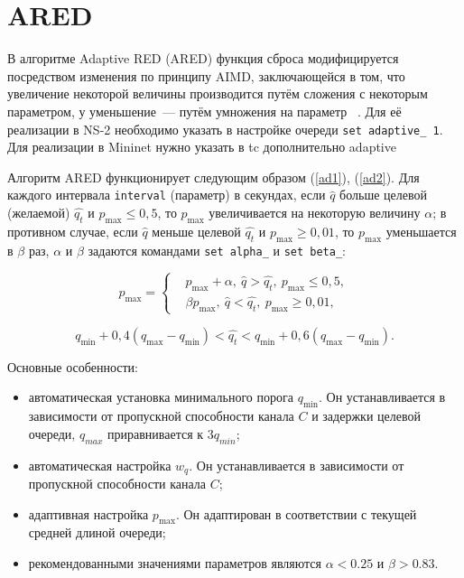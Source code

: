 \section{ARED}

В алгоритме Adaptive RED (ARED) функция сброса модифицируется
посредством изменения по принципу AIMD, заключающейся в том, что
увеличение некоторой величины производится путём сложения с некоторым
параметром, у уменьшение~--- путём умножения на
параметр ~\citep{ARED}. Для её реализации в NS-2 необходимо указать в
настройке очереди \verb|set adaptive_ 1|. Для реализации в Mininet нужно указать в tc дополнительно adaptive

Алгоритм ARED функционирует следующим образом (\ref{ad1}),
(\ref{ad2}). Для каждого интервала \verb|interval| (параметр) в
секундах, если $\hat{q}$ больше целевой (желаемой) $\hat{q_t}$ и
$p_{\max} \leqslant 0,5$, то $p_{\max}$ увеличивается на некоторую
величину $\alpha$; в противном случае, если $\hat{q}$ меньше целевой
$\hat{q_t}$ и $p_{\max}\geqslant 0,01$, то $p_{\max}$ уменьшается в
$\beta$ раз, $\alpha$ и $\beta$ задаются командами \verb|set alpha_| и \verb|set beta_|:

\begin{equation}
\label{ad1}
p_{\max} = \left\{
  \begin{aligned}
    & p_{\max}+\alpha, \ \hat{q}>\hat{q_{t}}, \ p_{\max} \leqslant 0,5, \\
    & \beta p_{\max}, \ \hat{q}<\hat{q_{t}}, \ p_{\max} \geqslant 0,01, 
  \end{aligned}
\right.
\end{equation}

\begin{equation}
\label{ad2}
q_{\min}+0,4(q_{\max}-q_{\min}) < \hat{q_t} < q_{\min}+0,6\left(q_{\max}-q_{\min}\right).
\end{equation}

Основные особенности: 
\begin{itemize}
\item автоматическая установка минимального порога $q_{\min}$. Он
  устанавливается в зависимости от пропускной способности канала $C$ и
  задержки целевой очереди, $q_{max}$ приравнивается к $3q_{min}$;
\item автоматическая настройка $w_{q}$. Он устанавливается в
  зависимости от пропускной способности канала $C$;
\item адаптивная настройка $p_{\max}$. Он адаптирован в соответствии с
  текущей средней длиной очереди;
\item рекомендованными значениями параметров являются $\alpha < 0.25 $ и $\beta > 0.83 $.
\end{itemize}



